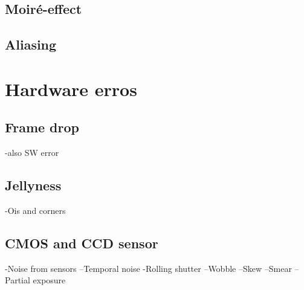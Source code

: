 \subsection{Moir\'{e}-effect}
\subsection{Aliasing}
\section{Hardware  erros}
\subsection{Frame drop}
-also SW error
\subsection{Jellyness}
-Ois and corners
\subsection{CMOS and CCD sensor}
-Noise from sensors
--Temporal noise
-Rolling shutter
--Wobble
--Skew
--Smear
--Partial exposure










